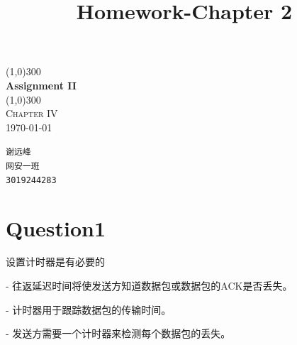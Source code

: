 \documentclass[UTF8]{article}
\title{Homework-Chapter 2}
\begin{document}
\begin{titlepage}
    \begin{center}
        \line(1,0){300}\\
        [0.65cm]
        \huge{\bfseries Assignment II }\\
        \line(1,0){300}\\
        \textsc{\Large Chapter IV}\\
        \textnormal{\Large \today}\\
        [5.5cm]
    \end{center}
    \begin{flushright}
        \texttt{\Large 谢远峰\\网安一班\\3019244283}\\
        [0.5cm]
    \end{flushright}
\end{titlepage}
\clearpage

\section*{Question1}
设置计时器是有必要的

- 往返延迟时间将使发送方知道数据包或数据包的ACK是否丢失。

- 计时器用于跟踪数据包的传输时间。

- 发送方需要一个计时器来检测每个数据包的丢失。
\end{document}
